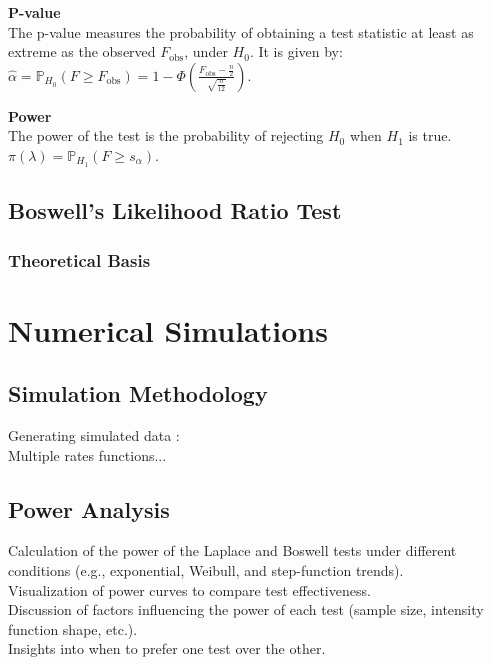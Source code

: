 \documentclass{journalstyle}
\begin{document}
\noindent\textbf{P-value} \\
The p-value measures the probability of obtaining a test statistic at least as extreme as the observed $F_{\text{obs}}$, under $H_0$.
It is given by: \\
$\hat{\alpha} = \mathbb{P}_{H_0}(F \geq F_{\text{obs}}) = 1 - \Phi(\frac{F_{\text{obs}} - \frac{n}{2}}{\sqrt{\frac{n}{12}}})$.

\noindent\textbf{Power} \\
The power of the test is the probability of rejecting $H_0$ when $H_1$ is true. \\
$\pi(\lambda) = \mathbb{P}_{H_1}(F \geq s_{\alpha})$.


\subsection{Boswell's Likelihood Ratio Test}

\subsubsection{Theoretical Basis}


\section{Numerical Simulations}

\subsection{Simulation Methodology}

Generating simulated data : \\
Multiple rates functions...

\subsection{Power Analysis}
Calculation of the power of the Laplace and Boswell tests under different conditions (e.g., exponential, Weibull, and step-function trends). \\

Visualization of power curves to compare test effectiveness. \\

Discussion of factors influencing the power of each test (sample size, intensity function shape, etc.). \\

Insights into when to prefer one test over the other.
\end{document}
